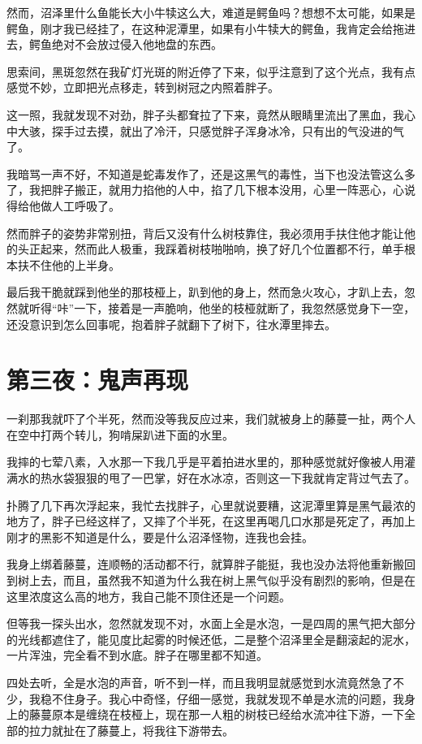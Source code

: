 然而，沼泽里什么鱼能长大小牛犊这么大，难道是鳄鱼吗？想想不太可能，如果是鳄鱼，刚才我已经挂了，在这种泥潭里，如果有小牛犊大的鳄鱼，我肯定会给拖进去，鳄鱼绝对不会放过侵入他地盘的东西。

思索间，黑斑忽然在我矿灯光斑的附近停了下来，似乎注意到了这个光点，我有点感觉不妙，立即把光点移走，转到树冠之内照着胖子。

这一照，我就发现不对劲，胖子头都耷拉了下来，竟然从眼睛里流出了黑血，我心中大骇，探手过去摸，就出了冷汗，只感觉胖子浑身冰冷，只有出的气没进的气了。

我暗骂一声不好，不知道是蛇毒发作了，还是这黑气的毒性，当下也没法管这么多了，我把胖子搬正，就用力掐他的人中，掐了几下根本没用，心里一阵恶心，心说得给他做人工呼吸了。

然而胖子的姿势非常别扭，背后又没有什么树枝靠住，我必须用手扶住他才能让他的头正起来，然而此人极重，我踩着树枝啪啪响，换了好几个位置都不行，单手根本扶不住他的上半身。

最后我干脆就踩到他坐的那枝桠上，趴到他的身上，然而急火攻心，才趴上去，忽然就听得“咔”一下，接着是一声脆响，他坐的枝桠就断了，我忽然感觉身下一空，还没意识到怎么回事呢，抱着胖子就翻下了树下，往水潭里摔去。

\chapter{第三夜：鬼声再现}

一刹那我就吓了个半死，然而没等我反应过来，我们就被身上的藤蔓一扯，两个人在空中打两个转儿，狗啃屎趴进下面的水里。

我摔的七荤八素，入水那一下我几乎是平着拍进水里的，那种感觉就好像被人用灌满水的热水袋狠狠的甩了一巴掌，好在水冰凉，否则这一下我就肯定背过气去了。

扑腾了几下再次浮起来，我忙去找胖子，心里就说要糟，这泥潭里算是黑气最浓的地方了，胖子已经这样了，又摔了个半死，在这里再喝几口水那是死定了，再加上刚才的黑影不知道是什么，要是什么沼泽怪物，连我也会挂。

我身上绑着藤蔓，连顺畅的活动都不行，就算胖子能挺，我也没办法将他重新搬回到树上去，而且，虽然我不知道为什么我在树上黑气似乎没有剧烈的影响，但是在这里浓度这么高的地方，我自己能不顶住还是一个问题。

但等我一探头出水，忽然就发现不对，水面上全是水泡，一是四周的黑气把大部分的光线都遮住了，能见度比起雾的时候还低，二是整个沼泽里全是翻滚起的泥水，一片浑浊，完全看不到水底。胖子在哪里都不知道。

四处去听，全是水泡的声音，听不到一样，而且我明显就感觉到水流竟然急了不少，我稳不住身子。我心中奇怪，仔细一感觉，我就发现不单是水流的问题，我身上的藤蔓原本是缠绕在枝桠上，现在那一人粗的树枝已经给水流冲往下游，一下全部的拉力就扯在了藤蔓上，将我往下游带去。

